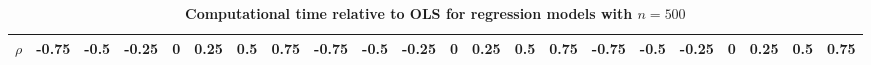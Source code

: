 \begin{table}
\centering
\renewcommand{\arraystretch}{1.15}
\setlength{\tabcolsep}{1.3pt}
\caption{\textbf{Computational time relative to OLS for regression models with $n=500$}}
\label{tab:average_CT}
\scriptsize{
\begin{tabular}{c|ccccccc|ccccccc|ccccccc}
\hline
\multicolumn{1}{c|}{\textbf{$\rho$}} & \multicolumn{1}{c}{\textbf{-0.75}} & \multicolumn{1}{c}{\textbf{-0.5}} & \multicolumn{1}{c}{\textbf{-0.25}} & \multicolumn{1}{c}{\textbf{0}} & \multicolumn{1}{c}{\textbf{0.25}} & \multicolumn{1}{c}{\textbf{0.5}} & \multicolumn{1}{c|}{\textbf{0.75}} & \multicolumn{1}{c}{\textbf{-0.75}} & \multicolumn{1}{c}{\textbf{-0.5}} & \multicolumn{1}{c}{\textbf{-0.25}} & \multicolumn{1}{c}{\textbf{0}} & \multicolumn{1}{c}{\textbf{0.25}} & \multicolumn{1}{c}{\textbf{0.5}} & \multicolumn{1}{c|}{\textbf{0.75}} & \multicolumn{1}{c}{\textbf{-0.75}} & \multicolumn{1}{c}{\textbf{-0.5}} & \multicolumn{1}{c}{\textbf{-0.25}} & \multicolumn{1}{c}{\textbf{0}} & \multicolumn{1}{c}{\textbf{0.25}} & \multicolumn{1}{c}{\textbf{0.5}} & \multicolumn{1}{c}{\textbf{0.75}} \\
\hline


\end{tabular}}
\end{table}
